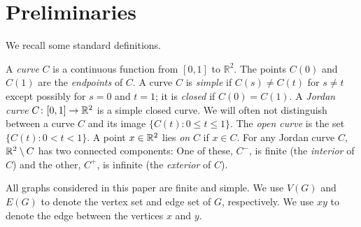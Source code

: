 \section{%
  Preliminaries}

We recall some %
standard definitions. %


%
\ifSODA
\else
A \emph{curve} $C$ is a continuous function from $[0,1]$
to $\mathbb{R}^2$.  The points $C(0)$ and $C(1)$ are the \emph{endpoints} of $C$.  A curve $C$ is \emph{simple} if $C(s)\neq C(t)$
for $s\ne t$ %
except possibly for $s=0$ and $t=1$; it is \emph{closed} if $C(0)=C(1)$.  A \emph{Jordan
	curve} $C\colon [0,1]\to\mathbb{R}^2$ is a simple closed curve.  
We will often not distinguish between a curve $C$ and its
image $\{C(t):0\le t\le 1\}$. %
The \emph{open curve} is the set $\{C(t):0< t< 1\}$.
%
A point $x\in\mathbb{R}^2$ lies \emph{on} $C$ if $x\in C$.  %
%
For any Jordan curve $C$, $\mathbb{R}^2\setminus C$ has two connected
components: One of these, $C^-$, is finite (the {\em interior} of $C$) and the other, $C^+$, is
infinite (the {\em exterior} of $C$).  
%


\fi

All graphs considered in this paper are finite and simple.   
We use $V(G)$ and $E(G)$ to denote the vertex set and edge
set of $G$, respectively.
We use $xy$
to denote the edge between the vertices %
$x$ and $y$. %

